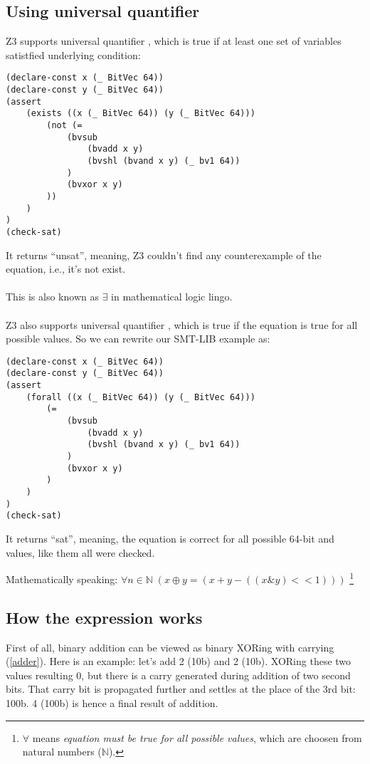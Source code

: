 \subsection{Using universal quantifier}

Z3 supports universal quantifier , which is true
if at least one set of variables satistfied underlying condition:

\begin{lstlisting}
(declare-const x (_ BitVec 64))
(declare-const y (_ BitVec 64))
(assert 
	(exists ((x (_ BitVec 64)) (y (_ BitVec 64)))
		(not (=
			(bvsub 
				(bvadd x y)
				(bvshl (bvand x y) (_ bv1 64))
			)
			(bvxor x y)
		))
	)
)
(check-sat)
\end{lstlisting}

It returns ``unsat'', meaning, Z3 couldn't find any counterexample of the equation, i.e., it's not exist.\\
\\
This is also known as $\exists$ in mathematical logic lingo.\\
\\
Z3 also supports universal quantifier , which is true if the equation is true for all
possible values.
So we can rewrite our SMT-LIB example as:

\begin{lstlisting}
(declare-const x (_ BitVec 64))
(declare-const y (_ BitVec 64))
(assert 
	(forall ((x (_ BitVec 64)) (y (_ BitVec 64)))
		(=
			(bvsub 
				(bvadd x y)
				(bvshl (bvand x y) (_ bv1 64))
			)
			(bvxor x y)
		)
	)
)
(check-sat)
\end{lstlisting}

It returns ``sat'', meaning, the equation is correct for all possible 64-bit  and  values,
like them all were checked.

Mathematically speaking: $\forall n\!\in\!\mathbb{N}\; (x \oplus y = (x + y - ((x \& y)<<1)))$
\footnote{
$\forall$ means \emph{equation must be true for all possible values}, which are choosen from natural numbers ($\mathbb{N}$).}

\subsection{How the expression works}

First of all, binary addition can be viewed as binary XORing with carrying (\ref{adder}).
Here is an example: let's add 2 (10b) and 2 (10b).
XORing these two values resulting 0, but there is a carry generated during addition of two second bits.
That carry bit is propagated further and settles at the place of the 3rd bit: 100b.
4 (100b) is hence a final result of addition.

